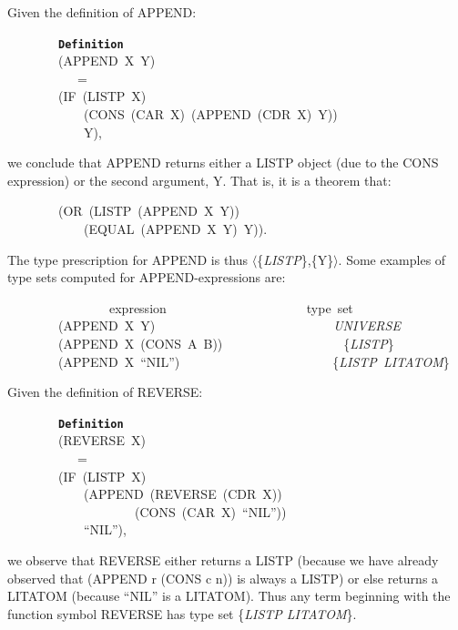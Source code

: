 \documentclass[11pt]{book}
\newenvironment{pubasis}{\begin{flushleft}\ttfamily\small}{\normalsize\rmfamily\end{flushleft}}
\newcommand{\axiomordefinition}[1]{\vspace{6pt}\texttt{\textbf{#1}}}
\newcommand{\pubinlineunderline}[1]{\emph{#1}}
\begin{document}
Given the definition of APPEND:
\begin{pubasis}
~~~~~~~~\axiomordefinition{Definition}\\
~~~~~~~~(APPEND~X~Y)\\
~~~~~~~~~~~=\\
~~~~~~~~(IF~(LISTP~X)\\
~~~~~~~~~~~~(CONS~(CAR~X)~(APPEND~(CDR~X)~Y))\\
~~~~~~~~~~~~Y),\\
\end{pubasis}
we conclude that APPEND returns either
a LISTP object (due to the CONS expression) or the second argument, Y.
That is, it is a theorem that:
\begin{pubasis}
~~~~~~~~(OR~(LISTP~(APPEND~X~Y))\\
~~~~~~~~~~~~(EQUAL~(APPEND~X~Y)~Y)).\\
\end{pubasis}
The type prescription for APPEND is thus $\langle$\{\pubinlineunderline{LISTP}\},\{Y\}$\rangle$.
Some examples of type sets computed for APPEND-expressions
are:
\begin{pubasis}
~~~~~~~~~~~~~~~~expression~~~~~~~~~~~~~~~~~~~~~~type~set\\

~~~~~~~~(APPEND~X~Y)~~~~~~~~~~~~~~~~~~~~~~~~~~~~\pubinlineunderline{UNIVERSE}\\
~~~~~~~~(APPEND~X~(CONS~A~B))~~~~~~~~~~~~~~~~~~~\{\pubinlineunderline{LISTP}\}\\
~~~~~~~~(APPEND~X~``NIL'')~~~~~~~~~~~~~~~~~~~~~~~~\{\pubinlineunderline{LISTP~LITATOM}\}\\
\end{pubasis}
Given the definition of REVERSE:
\begin{pubasis}
~~~~~~~~\axiomordefinition{Definition}\\
~~~~~~~~(REVERSE~X)\\
~~~~~~~~~~~=\\
~~~~~~~~(IF~(LISTP~X)\\
~~~~~~~~~~~~(APPEND~(REVERSE~(CDR~X))\\
~~~~~~~~~~~~~~~~~~~~(CONS~(CAR~X)~``NIL''))\\
~~~~~~~~~~~~``NIL''),\\
\end{pubasis}
we observe that REVERSE either returns a LISTP (because
we have already observed that (APPEND r (CONS c n)) is always a LISTP) or else
returns a LITATOM (because ``NIL'' is a LITATOM).  Thus any term
beginning with the function symbol REVERSE has type set \{\pubinlineunderline{LISTP LITATOM}\}.
\end{document}
